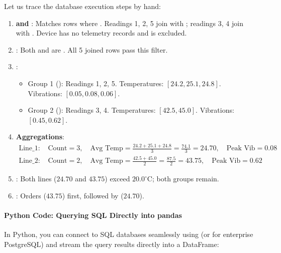 Let us trace the database execution steps by hand:
\begin{enumerate}
    \item \textbf{ and }: Matches rows where . 
    Readings 1, 2, 5 join with ; readings 3, 4 join with . Device  has no telemetry records and is excluded.
    \item \textbf{}: Both  and  are . All 5 joined rows pass this filter.
    \item \textbf{}:
    \begin{itemize}
        \item Group 1 (): Readings 1, 2, 5. Temperatures: $[24.2, 25.1, 24.8]$. Vibrations: $[0.05, 0.08, 0.06]$.
        \item Group 2 (): Readings 3, 4. Temperatures: $[42.5, 45.0]$. Vibrations: $[0.45, 0.62]$.
    \end{itemize}
    \item \textbf{Aggregations}:
    \begin{align*}
    \text{Line\_1: } & \text{Count} = 3, \quad \text{Avg Temp} = \frac{24.2 + 25.1 + 24.8}{3} = \frac{74.1}{3} = \mathbf{24.70}, \quad \text{Peak Vib} = \mathbf{0.08} \\
    \text{Line\_2: } & \text{Count} = 2, \quad \text{Avg Temp} = \frac{42.5 + 45.0}{2} = \frac{87.5}{2} = \mathbf{43.75}, \quad \text{Peak Vib} = \mathbf{0.62}
    \end{align*}
    \item \textbf{}: Both lines ($24.70$ and $43.75$) exceed $20.0^\circ\text{C}$; both groups remain.
    \item \textbf{}: Orders  ($43.75$) first, followed by  ($24.70$).
\end{enumerate}

\paragraph{Python Code: Querying SQL Directly into pandas}
In Python, you can connect to SQL databases seamlessly using  (or  for enterprise PostgreSQL) and stream the query results directly into a DataFrame:

